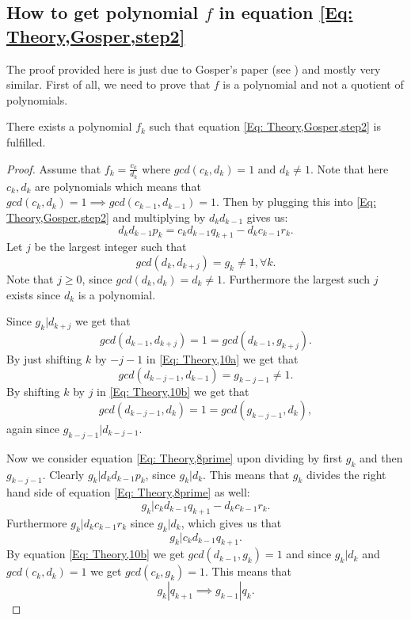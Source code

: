 \subsection{How to get polynomial $f$ in equation \eqref{Eq: Theory,Gosper,step2}}\label{Sub: getf}
The proof provided here is just due to Gosper's paper (see ) and mostly very similar. First of all, we need to prove that $f$ is a polynomial and not a quotient of polynomials.
\begin{theorem}
  There exists a polynomial $f_k$ such that equation \eqref{Eq: Theory,Gosper,step2} is fulfilled.
\end{theorem}
\begin{proof}
  Assume that $f_k=\frac{c_k}{d_k}$ where $gcd(c_k,d_k)=1$ and $d_k\neq 1$. Note that here $c_k,d_k$ are polynomials which means that $gcd(c_k,d_k)=1\implies gcd(c_{k-1},d_{k-1})=1$. Then by plugging this into \eqref{Eq: Theory,Gosper,step2} and multiplying by $d_kd_{k-1}$ gives us:
  \begin{equation}\label{Eq: Theory,8prime}
    d_kd_{k-1}p_k = c_kd_{k-1}q_{k+1} - d_kc_{k-1}r_k.
  \end{equation}
  Let $j$ be the largest integer such that
  \begin{equation}\label{Eq: Theory,10a}
    gcd(d_k,d_{k+j})=g_k\neq 1, \forall k.
  \end{equation}
  Note that $j\geq 0$, since $gcd(d_k,d_k)=d_k\neq 1$. Furthermore the largest such $j$ exists since $d_k$ is a polynomial.

  Since $g_k|d_{k+j}$ we get that
  \begin{equation}\label{Eq: Theory,10b}
    gcd(d_{k-1},d_{k+j})=1=gcd(d_{k-1},g_{k+j}).
  \end{equation}
  By just shifting $k$ by $-j-1$ in \eqref{Eq: Theory,10a} we get that
  \begin{equation}\label{Eq: Theory,10c}
    gcd(d_{k-j-1},d_{k-1})=g_{k-j-1}\neq 1.
  \end{equation}
  By shifting $k$ by $j$ in \eqref{Eq: Theory,10b} we get that
  \begin{equation}\label{Eq: Theory,10d}
    gcd(d_{k-j-1},d_k) = 1 = gcd(g_{k-j-1},d_k),
  \end{equation}
  again since $g_{k-j-1}|d_{k-j-1}$.

  Now we consider equation \eqref{Eq: Theory,8prime} upon dividing by first $g_k$ and then $g_{k-j-1}$. Clearly $g_k|d_kd_{k-1}p_k$, since $g_k|d_k$. This means that $g_k$ divides the right hand side of equation \eqref{Eq: Theory,8prime} as well:
  \begin{equation}
    g_k|c_kd_{k-1}q_{k+1}-d_kc_{k-1}r_k.
  \end{equation}
  Furthermore $g_k|d_kc_{k-1}r_k$ since $g_k|d_k$, which gives us that
  \begin{equation}
    g_k|c_kd_{k-1}q_{k+1}.
  \end{equation}
  By equation \eqref{Eq: Theory,10b} we get $gcd(d_{k-1},g_k)=1$ and since $g_k|d_k$ and $gcd(c_k,d_k)=1$ we get $gcd(c_k,g_k)=1$. This means that
  \begin{equation}
    g_k|q_{k+1} \implies g_{k-1}|q_k.
  \end{equation}


\end{proof}
